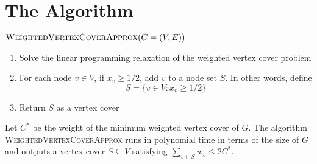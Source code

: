 \documentclass[11  pt]{article}
\begin{document}
\section{The Algorithm}
	$\textsc{WeightedVertexCoverApprox}(G = (V,E))$
\begin{enumerate}
	\item Solve the linear programming relaxation of the weighted vertex cover problem
	\item For each node $v \in V$, if $x_v \geq 1/2$, add $v$ to a node set $S$. In other words, define
	\begin{equation*}
		S = \{v \in V \colon x_v \geq 1/2\}
	\end{equation*}
	\item Return $S$ as a vertex cover
\end{enumerate}
\begin{theorem}
	Let $C^*$ be the weight of the minimum weighted vertex cover of $G$. The algorithm \textsc{WeightedVertexCoverApprox} runs in polynomial time in terms of the size of $G$ and outputs a vertex cover $S \subseteq V$ satisfying $\sum_{v \in S} w_v\leq 2C^*$. 
\end{theorem}
	
	
	
	
	
	
	
\end{document}
